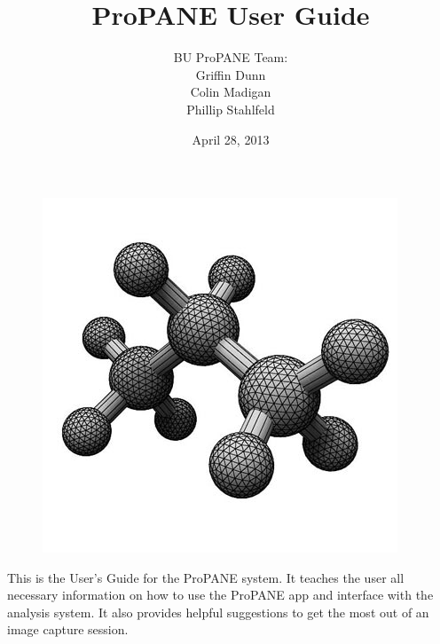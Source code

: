 \documentclass[]{article}
\begin{document}
	\setlength{\parindent}{0pt}
	\setlength{\parskip}{6pt}

	\begin{titlepage}



		\title{\textbf{ProPANE User Guide}}
		\author{BU ProPANE Team:\\Griffin Dunn\\Colin Madigan\\Phillip Stahlfeld}
		\date{April 28, 2013}
		\maketitle

\begin{figure}[h]
\centering
\includegraphics[scale=0.3]{images/logo}
\end{figure}

		\noindent
		
		This is the User's Guide for the ProPANE system.  It teaches the user all necessary information on how to use the ProPANE app and interface with the analysis system.  It also provides helpful suggestions to get the most out of an image capture session. 
		\thispagestyle{empty}
		
		
		
	\end{titlepage}
	
	
	
	
	\tableofcontents
	\newpage
	
	\setcounter{page}{1}
	\thispagestyle{empty}
	
\end{document}
